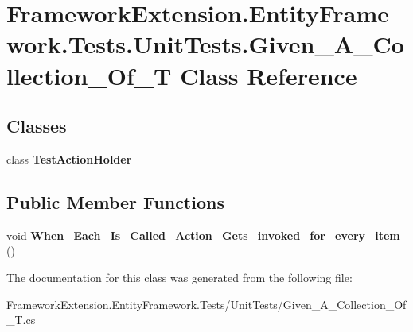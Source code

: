 \hypertarget{class_framework_extension_1_1_entity_framework_1_1_tests_1_1_unit_tests_1_1_given___a___collection___of___t}{\section{Framework\-Extension.\-Entity\-Framework.\-Tests.\-Unit\-Tests.\-Given\-\_\-\-A\-\_\-\-Collection\-\_\-\-Of\-\_\-\-T Class Reference}
\label{class_framework_extension_1_1_entity_framework_1_1_tests_1_1_unit_tests_1_1_given___a___collection___of___t}
}
\subsection*{Classes}
\begin{DoxyCompactItemize}
\item 
class {\bfseries Test\-Action\-Holder}
\end{DoxyCompactItemize}
\subsection*{Public Member Functions}
\begin{DoxyCompactItemize}
\item 
\hypertarget{class_framework_extension_1_1_entity_framework_1_1_tests_1_1_unit_tests_1_1_given___a___collection___of___t_a26dfbbbbf943d834726f63567c45d7ca}{void {\bfseries When\-\_\-\-Each\-\_\-\-Is\-\_\-\-Called\-\_\-\-Action\-\_\-\-Gets\-\_\-invoked\-\_\-for\-\_\-every\-\_\-item} ()}\label{class_framework_extension_1_1_entity_framework_1_1_tests_1_1_unit_tests_1_1_given___a___collection___of___t_a26dfbbbbf943d834726f63567c45d7ca}

\end{DoxyCompactItemize}


The documentation for this class was generated from the following file\-:\begin{DoxyCompactItemize}
\item 
Framework\-Extension.\-Entity\-Framework.\-Tests/\-Unit\-Tests/Given\-\_\-\-A\-\_\-\-Collection\-\_\-\-Of\-\_\-\-T.\-cs\end{DoxyCompactItemize}
